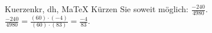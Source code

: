 \begin{MAufgabe}{Kuerzen}{kr, dh, MaTeX}
K\"urzen Sie soweit m\"oglich: $\frac{-240}{4980}$.\\ 
\ifLsg\MLoesung
\quad $\frac{-240}{4980}=\frac{(60)\cdot(-4)}{(60)\cdot(83)}=\frac{-4}{83}$.\else\relax\fi
 \end{MAufgabe}